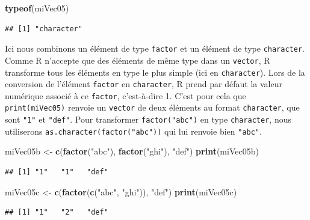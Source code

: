 \documentclass[
]{book}
\newenvironment{Shaded}{\begin{snugshade}}{\end{snugshade}}
\newcommand{\KeywordTok}[1]{\textcolor[rgb]{0.13,0.29,0.53}{\textbf{#1}}}
\newcommand{\NormalTok}[1]{#1}
\newcommand{\StringTok}[1]{\textcolor[rgb]{0.31,0.60,0.02}{#1}}
\begin{document}
\begin{Shaded}
\begin{Highlighting}[]
\KeywordTok{typeof}\NormalTok{(miVec05)}
\end{Highlighting}
\end{Shaded}

\begin{verbatim}
## [1] "character"
\end{verbatim}

Ici nous combinons un élément de type \texttt{factor} et un élément de type \texttt{character}. Comme R n'accepte que des éléments de même type dans un \texttt{vector}, R transforme tous les éléments en type le plus simple (ici en \texttt{character}). Lors de la conversion de l'élément \texttt{factor} en \texttt{character}, R prend par défaut la valeur numérique associé à ce \texttt{factor}, c'est-à-dire 1. C'est pour cela que \texttt{print(miVec05)} renvoie un \texttt{vector} de deux éléments au format \texttt{character}, que sont \texttt{"1"} et \texttt{"def"}. Pour transformer \texttt{factor("abc")} en type \texttt{character}, nous utiliserons \texttt{as.character(factor("abc"))} qui lui renvoie bien \texttt{"abc"}.

\begin{Shaded}
\begin{Highlighting}[]
\NormalTok{miVec05b <-}\StringTok{ }\KeywordTok{c}\NormalTok{(}\KeywordTok{factor}\NormalTok{(}\StringTok{"abc"}\NormalTok{), }\KeywordTok{factor}\NormalTok{(}\StringTok{"ghi"}\NormalTok{), }\StringTok{"def"}\NormalTok{)}
\KeywordTok{print}\NormalTok{(miVec05b)}
\end{Highlighting}
\end{Shaded}

\begin{verbatim}
## [1] "1"   "1"   "def"
\end{verbatim}

\begin{Shaded}
\begin{Highlighting}[]
\NormalTok{miVec05c <-}\StringTok{ }\KeywordTok{c}\NormalTok{(}\KeywordTok{factor}\NormalTok{(}\KeywordTok{c}\NormalTok{(}\StringTok{"abc"}\NormalTok{, }\StringTok{"ghi"}\NormalTok{)), }\StringTok{"def"}\NormalTok{)}
\KeywordTok{print}\NormalTok{(miVec05c)}
\end{Highlighting}
\end{Shaded}

\begin{verbatim}
## [1] "1"   "2"   "def"
\end{verbatim}
\end{document}
